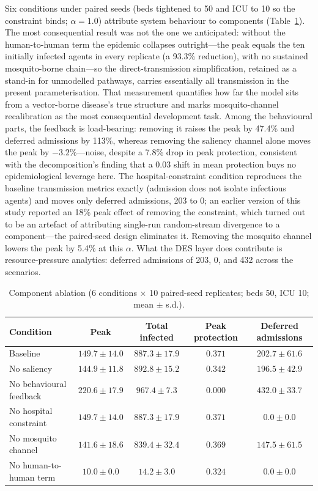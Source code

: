 \documentclass[]{interact}
\begin{document}
Six conditions under paired seeds (beds tightened to 50 and ICU to 10 so the constraint binds; $\alpha{=}1.0$) attribute system behaviour to components (Table~\ref{tab:ablation}). The most consequential result was not the one we anticipated: without the human-to-human term the epidemic collapses outright---the peak equals the ten initially infected agents in every replicate (a 93.3\% reduction), with no sustained mosquito-borne chain---so the direct-transmission simplification, retained as a stand-in for unmodelled pathways, carries essentially all transmission in the present parameterisation. That measurement quantifies how far the model sits from a vector-borne disease's true structure and marks mosquito-channel recalibration as the most consequential development task. Among the behavioural parts, the feedback is load-bearing: removing it raises the peak by 47.4\% and deferred admissions by 113\%, whereas removing the saliency channel alone moves the peak by $-3.2\%$---noise, despite a 7.8\% drop in peak protection, consistent with the decomposition's finding that a 0.03 shift in mean protection buys no epidemiological leverage here. The hospital-constraint condition reproduces the baseline transmission metrics exactly (admission does not isolate infectious agents) and moves only deferred admissions, 203 to 0; an earlier version of this study reported an 18\% peak effect of removing the constraint, which turned out to be an artefact of attributing single-run random-stream divergence to a component---the paired-seed design eliminates it. Removing the mosquito channel lowers the peak by 5.4\% at this $\alpha$. What the DES layer does contribute is resource-pressure analytics: deferred admissions of 203, 0, and 432 across the scenarios.

\begin{table}[htb]
\centering
\small
\begin{tabular}{lcccc}
\hline
\textbf{Condition} & \textbf{Peak} & \textbf{Total infected} & \textbf{Peak protection} & \textbf{Deferred admissions} \\
\hline
Baseline & $149.7 \pm 14.0$ & $887.3 \pm 17.9$ & $0.371$ & $202.7 \pm 61.6$ \\
No saliency & $144.9 \pm 11.8$ & $892.8 \pm 15.2$ & $0.342$ & $196.5 \pm 42.9$ \\
No behavioural feedback & $220.6 \pm 17.9$ & $967.4 \pm 7.3$ & $0.000$ & $432.0 \pm 33.7$ \\
No hospital constraint & $149.7 \pm 14.0$ & $887.3 \pm 17.9$ & $0.371$ & $0.0 \pm 0.0$ \\
No mosquito channel & $141.6 \pm 18.6$ & $839.4 \pm 32.4$ & $0.369$ & $147.5 \pm 61.5$ \\
No human-to-human term & $10.0 \pm 0.0$ & $14.2 \pm 3.0$ & $0.324$ & $0.0 \pm 0.0$ \\
\hline
\end{tabular}
\caption{Component ablation (6 conditions $\times$ 10 paired-seed replicates; beds 50, ICU 10; mean $\pm$ s.d.).}
\label{tab:ablation}
\end{table}
\end{document}
